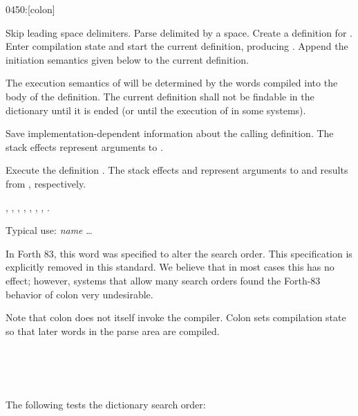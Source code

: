 \begin{worddef}{0450}{:}[colon]
\item {}

	Skip leading space delimiters. Parse  delimited by a
	space. Create a definition for . Enter compilation state and start the current
	definition, producing . Append the initiation
	semantics given below to the current definition.

	The execution semantics of  will be determined by the
	words compiled into the body of the definition. The current
	definition shall not be findable in the dictionary until it is
	ended (or until the execution of  in some systems).

\init {}

	Save implementation-dependent information 
	about the calling definition. The stack effects 
	represent arguments to .

\execute[name]

	Execute the definition . The stack effects
	 and  represent arguments to and
	results from , respectively.

\see {},
	,
	,
	,
	\wref{core:[}{[},
	\wref{core:]}{]},
	,
	.

	\begin{rationale} %
		Typical use:
			\word{:} \emph{name} {\ldots} \word{;}

		In Forth 83, this word was specified to alter the search order.
		This specification is explicitly removed in this standard. We
		believe that in most cases this has no effect; however, systems
		that allow many search orders found the Forth-83 behavior of
		colon very undesirable.

		Note that colon does not itself invoke the compiler. Colon sets
		compilation state so that later words in the parse area are
		compiled.
	\end{rationale}

	\begin{testing} %
		 \\
		 \\
		 \\

		The following tests the dictionary search order:

		 \\
	\end{testing}
\end{worddef}

